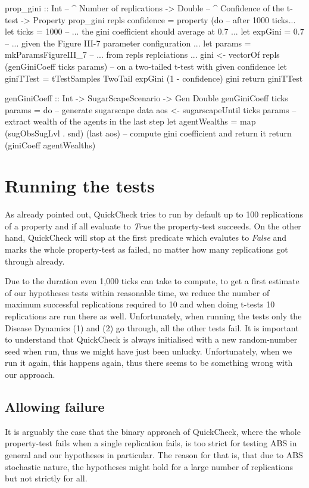 \begin{HaskellCode}
prop_gini :: Int      -- ^ Number of replications
          -> Double   -- ^ Confidence of the t-test
          -> Property
prop_gini repls confidence = property (do
  -- after 1000 ticks...
  let ticks = 1000
  -- ... the gini coefficient should average at 0.7 ...
  let expGini = 0.7
  -- ... given the Figure III-7 parameter configuration ...
  let params = mkParamsFigureIII_7
  -- ... from repls replciations ... 
  gini <- vectorOf repls (genGiniCoeff ticks params)
  -- on a two-tailed t-test with given confidence
  let giniTTest = tTestSamples TwoTail expGini (1 - confidence) gini
  return giniTTest
  
genGiniCoeff :: Int -> SugarScapeScenario -> Gen Double
genGiniCoeff ticks params = do
  -- generate sugarscape data
  aos <- sugarscapeUntil ticks params
  -- extract wealth of the agents in the last step
  let agentWealths = map (sugObsSugLvl . snd) (last aos)
  -- compute gini coefficient and return it
  return (giniCoeff agentWealths)
\end{HaskellCode}

\section{Running the tests}
As already pointed out, QuickCheck tries to run by default up to 100 replications  of a property and if all evaluate to \textit{True} the property-test succeeds. On the other hand, QuickCheck will stop at the first predicate which evalutes to \textit{False} and marks the whole property-test as failed, no matter how many replications got through already. 

Due to the duration even 1,000 ticks can take to compute, to get a first estimate of our hypotheses tests within reasonable time, we reduce the number of maximum successful replications required to 10 and when doing t-tests 10 replications are run there as well. Unfortunately, when running the tests only the Disease Dynamics (1) and (2) go through, all the other tests fail. It is important to understand that QuickCheck is always initialised with a new random-number seed when run, thus we might have just been unlucky. Unfortunately, when we run it again, this happens again, thus there seems to be something wrong with our approach.

\subsection{Allowing failure}
It is arguably the case that the binary approach of QuickCheck, where the whole property-test fails when a single replication fails, is too strict for testing ABS in general and our hypotheses in particular. The reason for that is, that due to ABS stochastic nature, the hypotheses might hold for a large number of replications but not strictly for all.

